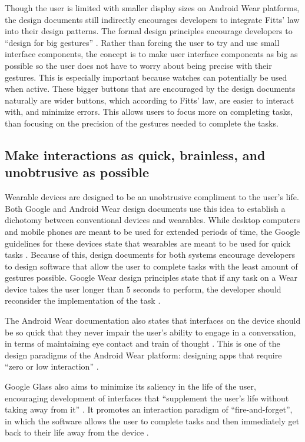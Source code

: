 \documentclass[12pt]{article}
\begin{document}
Though the user is limited with smaller display sizes on Android Wear platforms, the design documents still indirectly encourages developers to integrate Fitts' law into their design patterns. The formal design principles encourage developers to ``design for big gestures'' \cite{andr}. Rather than forcing the user to try and use small interface components, the concept is to make user interface components as big as possible so the user does not have to worry about being precise with their gestures. This is especially important because watches can potentially be used when active. These bigger buttons that are encouraged by the design documents naturally are wider buttons, which according to Fitts' law, are easier to interact with, and minimize errors. This allows users to focus more on completing tasks, than focusing on the precision of the gestures needed to complete the tasks.

\subsection{Make interactions as quick, brainless, and unobtrusive as possible}
Wearable devices are designed to be an unobtrusive compliment to the user's life. Both Google and Android Wear design documents use this idea to establish a dichotomy between conventional devices and wearables. While desktop computers and mobile phones are meant to be used for extended periods of time, the Google guidelines for these devices state that wearables are meant to be used for quick tasks \cite{andr} \cite{goog}. Because of this, design documents for both systems encourage developers to design software that allow the user to complete tasks with the least amount of gestures possible. Google Wear design principles state that if any task on a Wear device takes the user longer than 5 seconds to perform, the developer should reconsider the implementation of the task \cite{andr}. 

The Android Wear documentation also states that interfaces on the device should be so quick that they never impair the user's ability to engage in a conversation, in terms of maintaining eye contact and train of thought \cite{andr}. This is one of the design paradigms of the Android Wear platform: designing apps that require ``zero or low interaction'' \cite{andr2}.

Google Glass also aims to minimize its saliency in the life of the user, encouraging development of interfaces that ``supplement the user's life without taking away from it'' \cite{goog}. It promotes an interaction paradigm of ``fire-and-forget'', in which the software allows the user to complete tasks and then immediately get back to their life away from the device \cite{goog}.
\end{document}
